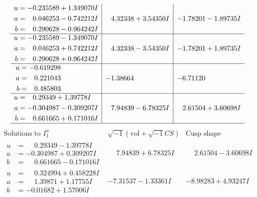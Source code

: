 \documentclass[1p]{elsarticle_modified}
\theoremstyle{definition}
\newcommand{\I}{\sqrt{-1}}
\begin{document}
$$\begin{array}{c|c|c}
\begin{aligned}
u &= -0.235589 + 1.349070 I \\
a &= \phantom{-}0.046253 - 0.742212 I \\
b &= \phantom{-}0.290628 - 0.964242 I\end{aligned}
 & \phantom{-}4.32338 + 3.54350 I & -1.78201 - 1.89735 I \\ \hline\begin{aligned}
u &= -0.235589 - 1.349070 I \\
a &= \phantom{-}0.046253 + 0.742212 I \\
b &= \phantom{-}0.290628 + 0.964242 I\end{aligned}
 & \phantom{-}4.32338 - 3.54350 I & -1.78201 + 1.89735 I \\ \hline\begin{aligned}
u &= -0.619298\phantom{ +0.000000I} \\
a &= \phantom{-}0.221043\phantom{ +0.000000I} \\
b &= \phantom{-}0.485803\phantom{ +0.000000I}\end{aligned}
 & -1.38664\phantom{ +0.000000I} & -6.71120\phantom{ +0.000000I} \\ \hline\begin{aligned}
u &= \phantom{-}0.29349 + 1.39778 I \\
a &= -0.304987 - 0.309207 I \\
b &= \phantom{-}0.661665 + 0.171016 I\end{aligned}
 & \phantom{-}7.94839 - 6.78325 I & \phantom{-}2.61504 + 3.60698 I\\
 \hline 
 \end{array}$$\newpage$$\begin{array}{c|c|c}  
\text{Solutions to }I^u_{1}& \I (\text{vol} + \sqrt{-1}CS) & \text{Cusp shape}\\
 \hline 
\begin{aligned}
u &= \phantom{-}0.29349 - 1.39778 I \\
a &= -0.304987 + 0.309207 I \\
b &= \phantom{-}0.661665 - 0.171016 I\end{aligned}
 & \phantom{-}7.94839 + 6.78325 I & \phantom{-}2.61504 - 3.60698 I \\ \hline\begin{aligned}
u &= \phantom{-}0.324994 + 0.458228 I \\
a &= \phantom{-}1.39871 + 1.17755 I \\
b &= -0.01682 + 1.57006 I\end{aligned}
 & -7.31537 - 1.33361 I & -8.98283 + 4.93247 I \\ \hline\begin{aligned}

\end{aligned}
\end{array}$$
\end{document}
